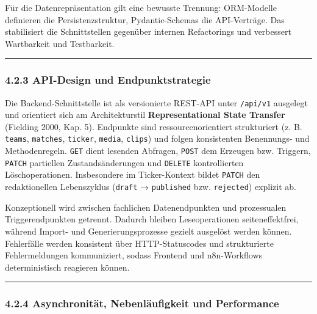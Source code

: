 Für die Datenrepräsentation gilt eine bewusste Trennung: ORM-Modelle
definieren die Persistenzstruktur, Pydantic-Schemas die API-Verträge.
Das stabilisiert die Schnittstellen gegenüber internen Refactorings und
verbessert Wartbarkeit und Testbarkeit.

\begin{center}\rule{0.5\linewidth}{0.5pt}\end{center}

\subsubsection{4.2.3 API-Design und
Endpunktstrategie}\label{api-design-und-endpunktstrategie}

Die Backend-Schnittstelle ist als versionierte REST-API unter
\passthrough{\lstinline!/api/v1!} ausgelegt und orientiert sich am
Architekturstil \textbf{Representational State Transfer} (Fielding 2000,
Kap. 5). Endpunkte sind ressourcenorientiert strukturiert (z. B.
\passthrough{\lstinline!teams!}, \passthrough{\lstinline!matches!},
\passthrough{\lstinline!ticker!}, \passthrough{\lstinline!media!},
\passthrough{\lstinline!clips!}) und folgen konsistenten Benennungs- und
Methodenregeln. \passthrough{\lstinline!GET!} dient lesenden Abfragen,
\passthrough{\lstinline!POST!} dem Erzeugen bzw. Triggern,
\passthrough{\lstinline!PATCH!} partiellen Zustandsänderungen und
\passthrough{\lstinline!DELETE!} kontrollierten Löschoperationen.
Insbesondere im Ticker-Kontext bildet \passthrough{\lstinline!PATCH!}
den redaktionellen Lebenszyklus (\passthrough{\lstinline!draft!} →
\passthrough{\lstinline!published!} bzw.
\passthrough{\lstinline!rejected!}) explizit ab.

Konzeptionell wird zwischen fachlichen Datenendpunkten und prozessualen
Triggerendpunkten getrennt. Dadurch bleiben Leseoperationen
seiteneffektfrei, während Import- und Generierungsprozesse gezielt
ausgelöst werden können. Fehlerfälle werden konsistent über
HTTP-Statuscodes und strukturierte Fehlermeldungen kommuniziert, sodass
Frontend und n8n-Workflows deterministisch reagieren können.

\begin{center}\rule{0.5\linewidth}{0.5pt}\end{center}

\subsubsection{4.2.4 Asynchronität, Nebenläufigkeit und
Performance}\label{asynchronituxe4t-nebenluxe4ufigkeit-und-performance}

